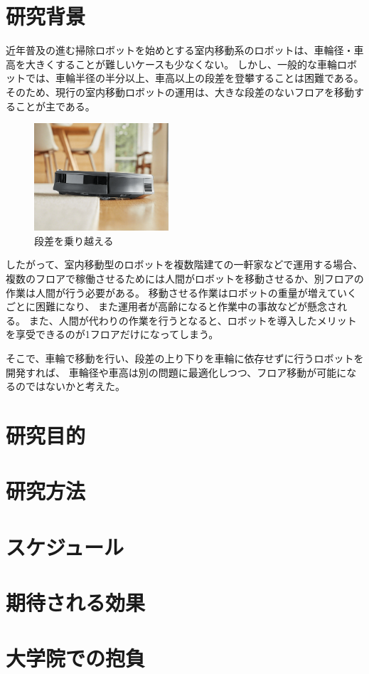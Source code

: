 \documentclass[dvipdfmx]{jsarticle}
\begin{document}

\section{研究背景}
近年普及の進む掃除ロボットを始めとする室内移動系のロボットは、車輪径・車高を大きくすることが難しいケースも少なくない。
しかし、一般的な車輪ロボットでは、車輪半径の半分以上、車高以上の段差を登攀することは困難である。
そのため、現行の室内移動ロボットの運用は、大きな段差のないフロアを移動することが主である。

\begin{figure}[htbp]
  \centering
  \includegraphics[width=50mm]{image/roomba.png}
  \caption{段差を乗り越える}
  \label{fig:runba}
\end{figure}

したがって、室内移動型のロボットを複数階建ての一軒家などで運用する場合、
複数のフロアで稼働させるためには人間がロボットを移動させるか、別フロアの作業は人間が行う必要がある。
移動させる作業はロボットの重量が増えていくごとに困難になり、
また運用者が高齢になると作業中の事故などが懸念される。
また、人間が代わりの作業を行うとなると、ロボットを導入したメリットを享受できるのが1フロアだけになってしまう。


そこで、車輪で移動を行い、段差の上り下りを車輪に依存せずに行うロボットを開発すれば、
車輪径や車高は別の問題に最適化しつつ、フロア移動が可能になるのではないかと考えた。
\section{研究目的}


\section{研究方法}
\section{スケジュール}
\section{期待される効果}
\section{大学院での抱負}
\end{document}
